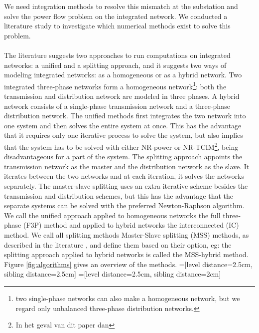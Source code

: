 \documentclass[10pt,journal]{article}
\begin{document}
We need integration methods to resolve this mismatch at the substation and solve the power flow problem on the integrated network. We conducted a literature study to investigate which numerical methods exist to solve this problem. \\ \\ 
The literature suggests two approaches to run computations on integrated networks: a unified and a splitting approach, and it suggests two ways of modeling integrated networks: as a homogeneous or as a hybrid network. Two integrated three-phase networks form a homogeneous network\footnote{two single-phase networks can also make a homogeneous network, but we regard only unbalanced three-phase distribution networks.}: both the transmission and distribution network are modeled in three phases. A hybrid network consists of a single-phase transmission network and a three-phase distribution network. The unified methods first integrates the two network into one system and then solves the entire system at once. This has the advantage that it requires only one iterative process to solve the system, but also implies that the system has to be solved with either NR-power or NR-TCIM\footnote{In het geval van dit paper dan}, being disadvantageous for a part of the system. The splitting approach appoints the transmission network as the master and the distribution network as the slave. It iterates between the two networks and at each iteration, it solves the networks separately. The master-slave splitting uses an extra iterative scheme besides the transmission and distribution schemes, but this has the advantage that the separate systems can be solved with the preferred Newton-Raphson algorithm. We call the unified approach applied to homogeneous networks the full three-phase (F3P) method and applied to hybrid networks the interconnected (IC) method. We call all splitting methods Master-Slave splitting (MSS) methods, as described in the literature \cite{Sun2008}, and define them based on their option, eg: the splitting approach applied to hybrid networks is called the MSS-hybrid method. Figure \ref{fig:algorithms} gives an overview of the methods. 
=[level distance=2.5cm, sibling distance=2.5cm]
=[level distance=2.5cm, sibling distance=2cm]
\end{document}
